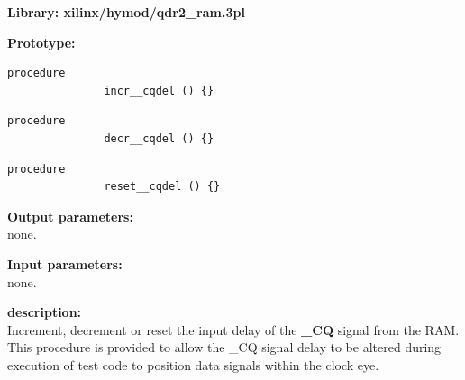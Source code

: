             {\bf Library: xilinx/hymod/qdr2\_ram.3pl}

            {\bf Prototype:} \\
            \vsp
            \begin{lstlisting}[gobble=12, language=threepl]
               procedure
               incr__cqdel () {}
            \end{lstlisting}
            \vsp
            \begin{lstlisting}[gobble=12, language=threepl]
               procedure
               decr__cqdel () {}
            \end{lstlisting}
            \vsp
            \begin{lstlisting}[gobble=12, language=threepl]
               procedure
               reset__cqdel () {}
            \end{lstlisting}

            {\bf Output parameters:} \\
            
            none.

            {\bf Input parameters:} \\
            
            none.

            {\bf description:} \\
            Increment, decrement or reset the input delay of the {\bf \_CQ}
            signal from the RAM. This procedure is provided to allow the \_CQ
            signal delay to be altered during execution of test code to
            position data signals within the clock eye.

